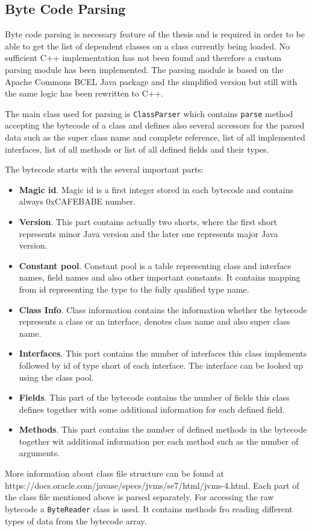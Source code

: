\subsection{Byte Code Parsing}
Byte code parsing is necessary feature of the thesis and is required in order to be able to get the list of dependent classes on a class currently being loaded. No sufficient C++ implementation has not been found and therefore a custom parsing module has been implemented. The parsing module is based on the Apache Commons BCEL Java package and the simplified version but still with the same logic has been rewritten to C++.

The main class used for parsing is \texttt{ClassParser} which contains \texttt{parse} method accepting the bytecode of a class and defines also several accessors  for the parsed data such as the super class name and complete reference, list of all implemented interfaces, list of all methods or list of all defined fields and their types.

The bytecode starts with the several important parts:
\begin{itemize}
	\item \textbf{Magic id}. Magic id is a first integer stored in each bytecode and contains  always 0xCAFEBABE number.
	\item \textbf{Version}. This part contains actually two shorts, where the first short represents minor Java version and the later one represents major Java version.
	\item \textbf{Constant pool}. Constant pool is a table representing class and interface names, field names and also other important constants. It contains mapping from id representing the type to the fully qualified type name.
	\item \textbf{Class Info}. Class information contains the information whether the bytecode represents a class or an interface, denotes class name and also super class name.
	\item \textbf{Interfaces}. This part contains the number of interfaces this class implements followed by id of type short of each interface. The interface can be looked up using the class pool.
	\item \textbf{Fields}. This part of the bytecode contains the number of fields this class defines together with some additional information for each defined field.
	\item \textbf{Methods}. This part contains the number of defined methods in the bytecode together wit additional information per each method such as the number of arguments.
\end{itemize}
More information about class file structure can be found at https://docs.oracle.com/javase/specs/jvms/se7/html/jvms-4.html. 
Each part of the class file mentioned above is parsed separately. For accessing the raw bytecode a \texttt{ByteReader} class is used. It contains methods fro reading different types of data from the bytecode array. 

